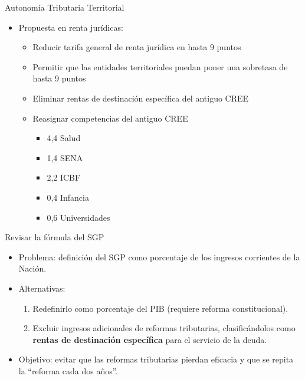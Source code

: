 \begin{frame}{Autonomía Tributaria Territorial}
\begin{itemize}
  \item Propuesta en renta jurídicas:
  \begin{itemize}
    \item Reducir tarifa general de renta jurídica en hasta 9 puntos 
    \item Permitir que las entidades territoriales puedan poner una sobretasa de hasta 9 puntos 
    \item Eliminar rentas de destinación específica del antiguo CREE
    \item Reasignar competencias del antiguo CREE 
    \begin{itemize}
        \item 4,4 Salud
        \item 1,4 SENA
        \item 2,2 ICBF 
        \item 0,4 Infancia
        \item 0,6 Universidades
    \end{itemize}
  \end{itemize}
\end{itemize}
\end{frame}
\begin{frame}{Revisar la fórmula del SGP}
\begin{itemize}
  \item Problema: definición del SGP como porcentaje de los ingresos corrientes de la Nación.
  \item Alternativas:
  \begin{enumerate}
    \item Redefinirlo como porcentaje del PIB (requiere reforma constitucional).
    \item Excluir ingresos adicionales de reformas tributarias, clasificándolos como \textbf{rentas de destinación específica} para el servicio de la deuda.
  \end{enumerate}
  \item Objetivo: evitar que las reformas tributarias pierdan eficacia y que se repita la “reforma cada dos años”.
\end{itemize}
\end{frame}
